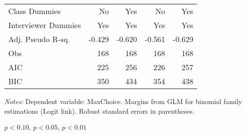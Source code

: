 \begin{table}[htbp]
\begin{threeparttable}
\begin{tabular}{l*{4}{D{.}{.}{-1}}}
Class Dummies       &                  No   &                 Yes   &                  No   &                 Yes   \\
Interviewer Dummies &                 Yes   &                 Yes   &                 Yes   &                 Yes   \\
\midrule
Adj. Pseudo R-sq.   &           -0.429      & -0.620                &  -0.561               &  -0.629               \\
Obs                 &                 168   &                 168   &                 168   &                 168   \\
AIC                 &                 225   &                 256   &                 226   &                 257   \\
BIC                 &                 350   &                 434   &                 354   &                 438   \\
\bottomrule
\end{tabular}
\begin{tablenotes}
\footnotesize
\item \textit{Notes:} Dependent variable: MaxChoice. Margins from GLM for binomial family estimations (Logit link). Robust standard errors in parentheses.
\item \sym{*} \(p<0.10\), \sym{**} \(p<0.05\), \sym{***} \(p<0.01\)
\end{tablenotes}
\end{threeparttable}
\label{tab:maxchoice_totaltr}
\end{table}